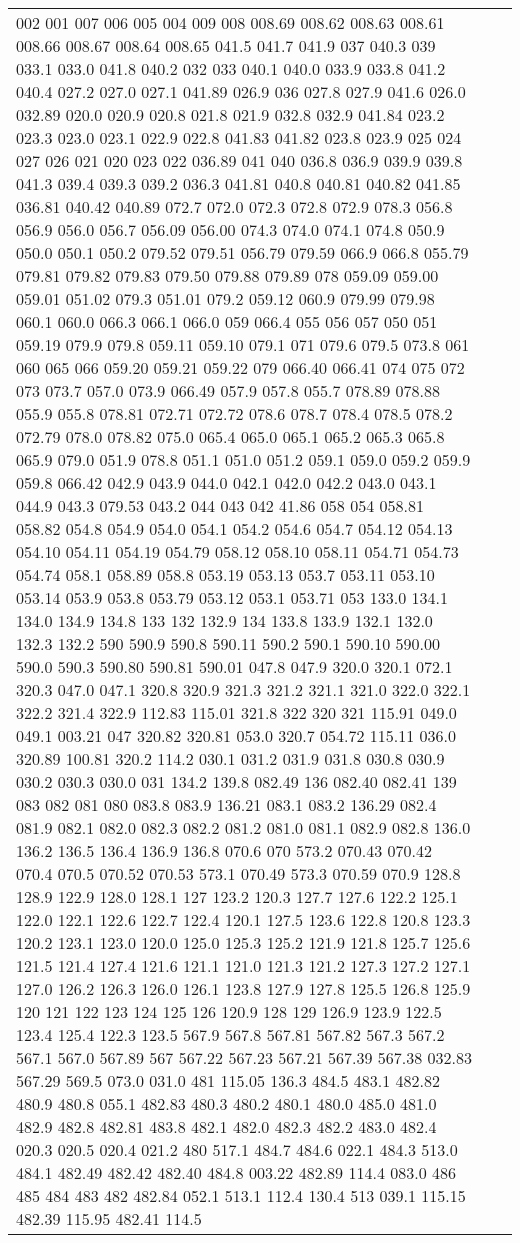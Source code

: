 \begin{longtable}{|R{.05in}|L{.5in}||L{5.75in}|}
002 001 007 006 005 004 009 008 008.69 008.62 008.63 008.61 008.66 008.67 008.64 008.65 041.5 041.7 041.9 037 040.3 039 033.1 033.0 041.8 040.2 032 033 040.1 040.0 033.9 033.8 041.2 040.4 027.2 027.0 027.1 041.89 026.9 036 027.8 027.9 041.6 026.0 032.89 020.0 020.9 020.8 021.8 021.9 032.8 032.9 041.84 023.2 023.3 023.0 023.1 022.9 022.8 041.83 041.82 023.8 023.9 025 024 027 026 021 020 023 022 036.89 041 040 036.8 036.9 039.9 039.8 041.3 039.4 039.3 039.2 036.3 041.81 040.8 040.81 040.82 041.85 036.81 040.42 040.89 072.7 072.0 072.3 072.8 072.9 078.3 056.8 056.9 056.0 056.7 056.09 056.00 074.3 074.0 074.1 074.8 050.9 050.0 050.1 050.2 079.52 079.51 056.79 079.59 066.9 066.8 055.79 079.81 079.82 079.83 079.50 079.88 079.89 078 059.09 059.00 059.01 051.02 079.3 051.01 079.2 059.12 060.9 079.99 079.98 060.1 060.0 066.3 066.1 066.0 059 066.4 055 056 057 050 051 059.19 079.9 079.8 059.11 059.10 079.1 071 079.6 079.5 073.8 061 060 065 066 059.20 059.21 059.22 079 066.40 066.41 074 075 072 073 073.7 057.0 073.9 066.49 057.9 057.8 055.7 078.89 078.88 055.9 055.8 078.81 072.71 072.72 078.6 078.7 078.4 078.5 078.2 072.79 078.0 078.82 075.0 065.4 065.0 065.1 065.2 065.3 065.8 065.9 079.0 051.9 078.8 051.1 051.0 051.2 059.1 059.0 059.2 059.9 059.8 066.42 042.9 043.9 044.0 042.1 042.0 042.2 043.0 043.1 044.9 043.3 079.53 043.2 044 043 042 41.86 058 054 058.81 058.82 054.8 054.9 054.0 054.1 054.2 054.6 054.7 054.12 054.13 054.10 054.11 054.19 054.79 058.12 058.10 058.11 054.71 054.73 054.74 058.1 058.89 058.8 053.19 053.13 053.7 053.11 053.10 053.14 053.9 053.8 053.79 053.12 053.1 053.71 053 133.0 134.1 134.0 134.9 134.8 133 132 132.9 134 133.8 133.9 132.1 132.0 132.3 132.2 590 590.9 590.8 590.11 590.2 590.1 590.10 590.00 590.0 590.3 590.80 590.81 590.01 047.8 047.9 320.0 320.1 072.1 320.3 047.0 047.1 320.8 320.9 321.3 321.2 321.1 321.0 322.0 322.1 322.2 321.4 322.9 112.83 115.01 321.8 322 320 321 115.91 049.0 049.1 003.21 047 320.82 320.81 053.0 320.7 054.72 115.11 036.0 320.89 100.81 320.2 114.2 030.1 031.2 031.9 031.8 030.8 030.9 030.2 030.3 030.0 031 134.2 139.8 082.49 136 082.40 082.41 139 083 082 081 080 083.8 083.9 136.21 083.1 083.2 136.29 082.4 081.9 082.1 082.0 082.3 082.2 081.2 081.0 081.1 082.9 082.8 136.0 136.2 136.5 136.4 136.9 136.8 070.6 070 573.2 070.43 070.42 070.4 070.5 070.52 070.53 573.1 070.49 573.3 070.59 070.9 128.8 128.9 122.9 128.0 128.1 127 123.2 120.3 127.7 127.6 122.2 125.1 122.0 122.1 122.6 122.7 122.4 120.1 127.5 123.6 122.8 120.8 123.3 120.2 123.1 123.0 120.0 125.0 125.3 125.2 121.9 121.8 125.7 125.6 121.5 121.4 127.4 121.6 121.1 121.0 121.3 121.2 127.3 127.2 127.1 127.0 126.2 126.3 126.0 126.1 123.8 127.9 127.8 125.5 126.8 125.9 120 121 122 123 124 125 126 120.9 128 129 126.9 123.9 122.5 123.4 125.4 122.3 123.5 567.9 567.8 567.81 567.82 567.3 567.2 567.1 567.0 567.89 567 567.22 567.23 567.21 567.39 567.38 032.83 567.29 569.5 073.0 031.0 481 115.05 136.3 484.5 483.1 482.82 480.9 480.8 055.1 482.83 480.3 480.2 480.1 480.0 485.0 481.0 482.9 482.8 482.81 483.8 482.1 482.0 482.3 482.2 483.0 482.4 020.3 020.5 020.4 021.2 480 517.1 484.7 484.6 022.1 484.3 513.0 484.1 482.49 482.42 482.40 484.8 003.22 482.89 114.4 083.0 486 485 484 483 482 482.84 052.1 513.1 112.4 130.4 513 039.1 115.15 482.39 115.95 482.41 114.5 
\end{longtable}
